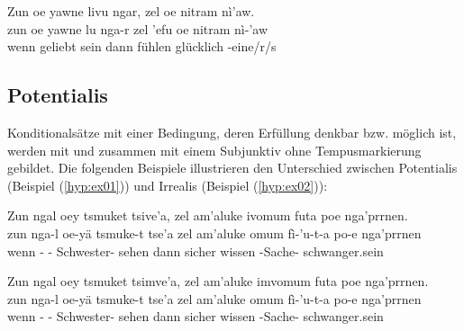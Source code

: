 \begin{interlin}
	\glll \Npawl{}Zun oe yawne livu ngar, zel  oe nitram nì'aw. \\
	zun oe yawne lu nga-r zel 'efu oe nitram nì-'aw \\
	wenn  geliebt sein  dann fühlen  glücklich -eine/r/s  \\
\end{interlin}

\subsection{Potentialis} 
Konditionalsätze mit einer Bedingung, deren Erfüllung denkbar bzw. möglich ist, werden mit   und   zusammen mit einem Subjunktiv ohne Tempusmarkierung gebildet. Die folgenden Beispiele illustrieren den Unterschied zwischen Potentialis (Beispiel (\ref{hyp:ex01})) und Irrealis (Beispiel (\ref{hyp:ex02})):


	\begin{interlin}\label{hyp:ex01}
		\glll \Npawl{}Zun ngal oey tsmuket tsive'a, zel am'aluke ivomum futa poe nga'prrnen.\\
		zun nga-l oe-yä tsmuke-t tse'a zel am'aluke omum fì-'u-t-a po-e nga'prrnen \\
		wenn - - Schwester- sehen dann sicher wissen -Sache-  schwanger.sein\\
	\end{interlin}
	
	\begin{interlin}\label{hyp:ex02}
		\glll \Npawl{}Zun ngal oey tsmuket tsimve'a, zel am'aluke imvomum futa poe nga'prrnen.\\
		zun nga-l oe-yä tsmuke-t tse'a zel am'aluke omum fì-'u-t-a po-e nga'prrnen \\
		wenn - - Schwester- sehen dann sicher wissen -Sache-  schwanger.sein \\
\end{interlin}

